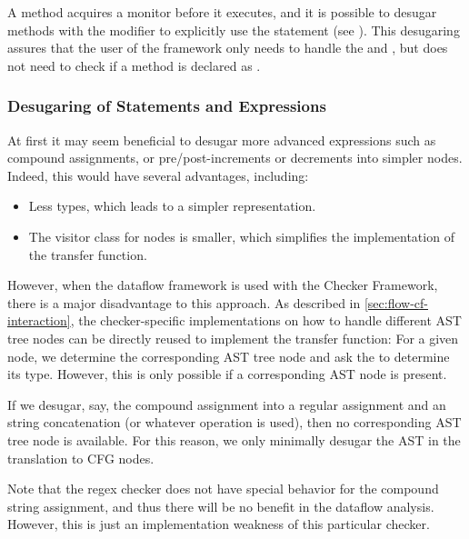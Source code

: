 A  method acquires a monitor before it executes, and it is possible
to desugar methods with the  modifier to explicitly use
the  statement (see ). This desugaring
assures that the user of the framework only needs to handle the
 and ,
but does not need to check if a method is declared as
.




\subsubsection{Desugaring of Statements and Expressions}

At first it may seem beneficial to desugar more advanced expressions such as compound
assignments, or pre/post-increments or decrements into simpler nodes.  Indeed, this would
have several advantages, including:
\begin{itemize}
    \item Less  types, which leads to a simpler representation.
    \item The visitor class for nodes is smaller, which simplifies the implementation
    of the transfer function.
\end{itemize}
However, when the dataflow framework is used with the Checker Framework, there is a major
disadvantage to this approach.  As described in \autoref{sec:flow-cf-interaction}, the
checker-specific implementations on how to handle different AST tree nodes can be directly
reused to implement the transfer function:  For a given node, we determine the corresponding
AST tree node and ask the  to determine its type.  However, this
is only possible if a corresponding AST node is present.

If we desugar, say, the compound assignment into a regular assignment and an string concatenation
(or whatever operation is used), then no corresponding AST tree node is available.
For this reason, we only minimally desugar the AST in the translation to
CFG nodes.

\begin{workinprogress}
    Note that the regex checker does not have special behavior for the compound string
    assignment, and thus there will be no benefit in the dataflow analysis.  However,
    this is just an implementation weakness of this particular checker.
\end{workinprogress}

